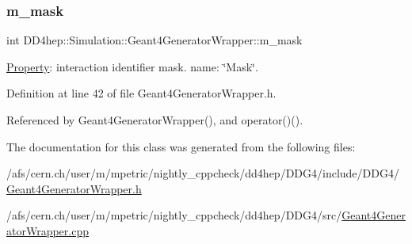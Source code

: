 \subsubsection{\texorpdfstring{m\+\_\+mask}{m\_mask}}
{\footnotesize\ttfamily int D\+D4hep\+::\+Simulation\+::\+Geant4\+Generator\+Wrapper\+::m\+\_\+mask\hspace{0.3cm}{\ttfamily [protected]}}



\hyperlink{class_d_d4hep_1_1_property}{Property}\+: interaction identifier mask. name\+: \char`\"{}\+Mask\char`\"{}. 



Definition at line 42 of file Geant4\+Generator\+Wrapper.\+h.



Referenced by Geant4\+Generator\+Wrapper(), and operator()().



The documentation for this class was generated from the following files\+:\begin{DoxyCompactItemize}
\item 
/afs/cern.\+ch/user/m/mpetric/nightly\+\_\+cppcheck/dd4hep/\+D\+D\+G4/include/\+D\+D\+G4/\hyperlink{_geant4_generator_wrapper_8h}{Geant4\+Generator\+Wrapper.\+h}\item 
/afs/cern.\+ch/user/m/mpetric/nightly\+\_\+cppcheck/dd4hep/\+D\+D\+G4/src/\hyperlink{_geant4_generator_wrapper_8cpp}{Geant4\+Generator\+Wrapper.\+cpp}\end{DoxyCompactItemize}
